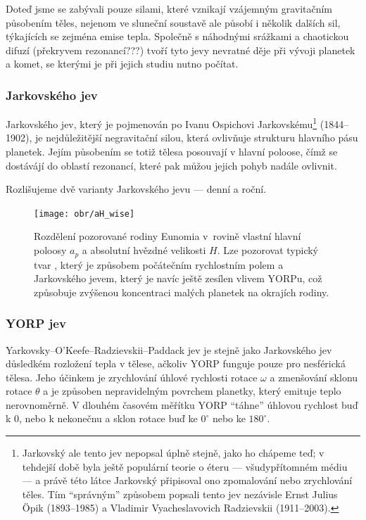 \documentclass[A4paper, 12pt, oneside]{book}
\begin{document}
Doteď jsme se zabývali pouze silami, které vznikají vzájemným gravitačním působením těles, nejenom ve sluneční soustavě ale působí i několik dalších sil, týkajících se zejména emise tepla. Společně s náhodnými srážkami a chaotickou difuzí (překryvem rezonancí???) tvoří tyto jevy nevratné děje při vývoji planetek a komet, se kterými je při jejich studiu nutno počítat.
\subsubsection{Jarkovského jev} \label{sec:jarko}

Jarkovského jev, který je pojmenován po Ivanu Ospichovi Jarkovskému\footnote{Jarkovský ale tento jev nepopsal úplně stejně, jako ho chápeme teď; v tehdejší době byla ještě populární teorie o éteru --- všudypřítomném médiu --- a právě této látce Jarkovský připisoval ono zpomalování nebo zrychlování těles. Tím \enquote{správným} způsobem popsali tento jev nezávisle Ernst Julius Öpik (1893--1985) a Vladimir Vyacheslavovich Radzievskii (1911--2003).}  (1844--1902), je nejdůležitější negravitační silou, která ovlivňuje strukturu hlavního pásu planetek. Jejím působením se totiž tělesa posouvají v hlavní poloose, čímž se dostávájí do oblastí rezonancí, které pak můžou jejich pohyb nadále ovlivnit.

Rozlišujeme dvě varianty Jarkovského jevu --- denní a roční. 
\begin{figure}[!htb]
	\centering
	\texttt{[image: obr/aH\_wise]}
	\caption{Rozdělení pozorované rodiny Eunomia v~rovině vlastní hlavní poloosy $a_p$ a absolutní hvězdné velikosti $H$. Lze pozorovat typický tvar , který je způsobem počátečním rychlostním polem a Jarkovského jevem, který je navíc ještě zesílen vlivem YORPu, což způsobuje zvýšenou koncentraci malých planetek na okrajích rodiny.}
	\label{aH_wise}
\end{figure}
\subsubsection{YORP jev}

Yarkovsky–O'Keefe–Radzievskii–Paddack jev je stejně jako Jarkovského jev důsledkém rozložení tepla v tělese, ačkoliv YORP funguje pouze pro nesférická tělesa. Jeho účinkem je zrychlování úhlové rychlosti rotace $\omega$ a zmenšování sklonu rotace $\theta$ a je způsoben nepravidelným povrchem planetky, který emituje teplo nerovnoměrně. V dlouhém časovém měřítku YORP \enquote{táhne} úhlovou rychlost buď k $0$, nebo k nekonečnu a sklon rotace buď ke $0^\circ$ nebo ke $180^\circ$. 
\end{document}
